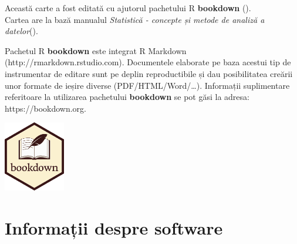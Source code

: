 \documentclass[
  11pt,
  b5paper,
  nottoc]{book}
\begin{document}

Această carte a fost editată cu ajutorul pachetului R \textbf{bookdown}
().\\
Cartea are la bază manualul \emph{Statistică - concepte și metode de
analiză a datelor}().

Pachetul R \textbf{bookdown} este integrat R Markdown
(http://rmarkdown.rstudio.com). Documentele elaborate pe baza acestui
tip de instrumentar de editare sunt pe deplin reproductibile și dau
posibilitatea creării unor formate de ieșire diverse
(PDF/HTML/Word/\ldots). Informații suplimentare referitoare la
utilizarea pachetului \textbf{bookdown} se pot găsi la adresa:
https://bookdown.org.

\includegraphics[width=0.2\textwidth]{images/logo.png}

\section*{Informații despre
software}\label{informaux21bii-despre-software}

\end{document}
